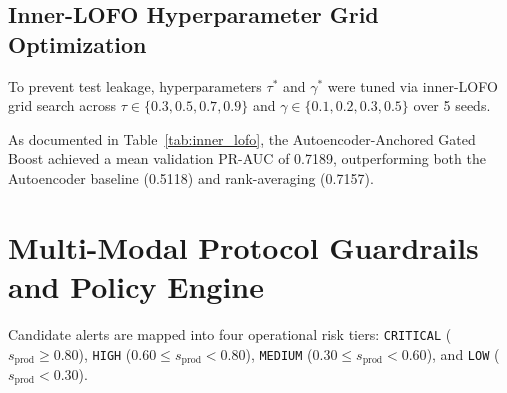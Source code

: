 \documentclass[conference]{IEEEtran}
\begin{document}
\subsection{Inner-LOFO Hyperparameter Grid Optimization}
To prevent test leakage, hyperparameters $\tau^*$ and $\gamma^*$ were tuned via inner-LOFO grid search across $\tau \in \{0.3, 0.5, 0.7, 0.9\}$ and $\gamma \in \{0.1, 0.2, 0.3, 0.5\}$ over 5 seeds.

\begin{table}[!t]
\caption{Inner-LOFO Hyperparameter Validation Results (Averaged Over 5 Random Seeds)}
\label{tab:inner_lofo}
\centering
{}
\end{table}

As documented in Table~\ref{tab:inner_lofo}, the Autoencoder-Anchored Gated Boost achieved a mean validation PR-AUC of 0.7189, outperforming both the Autoencoder baseline (0.5118) and rank-averaging (0.7157).

\section{Multi-Modal Protocol Guardrails and Policy Engine}
Candidate alerts are mapped into four operational risk tiers: \texttt{CRITICAL} ($s_{\text{prod}} \ge 0.80$), \texttt{HIGH} ($0.60 \le s_{\text{prod}} < 0.80$), \texttt{MEDIUM} ($0.30 \le s_{\text{prod}} < 0.60$), and \texttt{LOW} ($s_{\text{prod}} < 0.30$).
\end{document}
